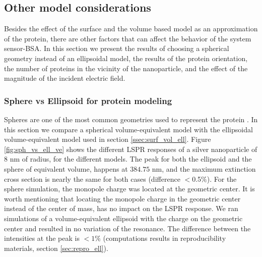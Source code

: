 \subsection{Other model considerations}

Besides the effect of the surface and the volume based model as an approximation of the protein, there are other
factors that can affect the behavior of the system sensor-BSA. In this section we present the results of choosing a spherical 
geometry instead of an ellipsoidal model, the results of the protein orientation, the number of proteins in the vicinity of the nanoparticle, and 
the effect of the magnitude of the incident electric field. 

\subsubsection{Sphere vs Ellipsoid for protein modeling}

Spheres are one of the most common geometries used to represent the protein \cite{SantiagoCordobaETal2011, UngerETal2009}. In this 
section we compare a spherical volume-equivalent model with the ellipsoidal volume-equivalent model used in section
\ref{ssec:surf_vol_ell}. Figure \ref{fig:sph_vs_ell_ve} shows the different LSPR responses of a silver nanoparticle of $8$ nm of radius, 
for the different models. The peak for both the ellipsoid and the sphere of equivalent volume, happens at $384.75$ nm, and the 
maximum extinction cross section is nearly the same for both cases (difference $<$0.5$\%$). For the sphere simulation, 
the monopole charge was located at the geometric center. It is worth mentioning that locating the monopole charge in the
geometric center instead of the center of mass, has no impact on the LSPR response. We ran simulations of a volume-equivalent ellipsoid 
with the charge on the geometric center and resulted in no variation of the resonance. The difference between the intensities at 
the peak is $<1\%$ (computations results in reproducibility materials, section \ref{sec:repro_ell}).

